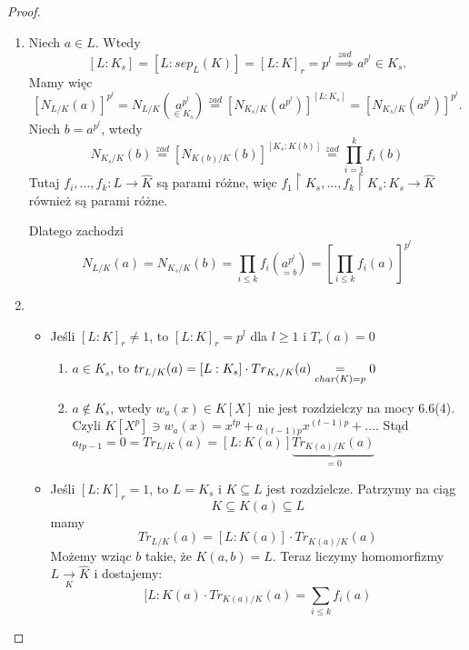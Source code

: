 \begin{proof}$ $\newline
\begin{enumerate}[leftmargin=*]
  \item Niech $a\in L$. Wtedy
    $$[L:K_s]=[L:sep_L(K)]=[L:K]_r=p^l\overset{zad}{\implies} a^{p^l}\in K_s.$$
    Mamy więc
    $$[N_{L/K}(a)]^{p^l}=N_{L/K}(\underset{{\scriptstyle\in K_s}}{a^{p^l}})\overset{zad}{=}[N_{K_s/K}(a^{p^l})]^{[L:K_s]}=[N_{K_s/K}(a^{p^l})]^{p^l}.$$
    Niech $b=a^{p^l}$, wtedy
    $$N_{K_s/K}(b)\overset{zad}{=}[N_{K(b)/K}(b)]^{[K_s:K(b)]}\overset{zad}{=}\prod_{i=1}^kf_i(b)$$
    Tutaj $f_i,...,f_k:L\to \hat{K}$ są parami różne, więc $f_1\restriction K_s,...,f_k\restriction K_s:K_s\to \hat{K}$ również są parami różne.

    Dlatego zachodzi
    $$N_{L/K}(a)=N_{K_s/K}(b)=\prod_{i\leq k}f_i(\underset{{\scriptstyle=b}}{a^{p^l}})=\left[\prod_{i\leq k}f_i(a)\right]^{p^l}$$

    \item 
      \begin{itemize}
        \item Jeśli $[L:K]_r\neq 1$, to $[L:K]_r=p^l$ dla $l\geq 1$ i $T_r(a)=0$
          \begin{enumerate}
             \item $a\in K_s$, to $tr_{L/K}(a)=[L:K_s]\cdot Tr_{K_s/K}(a)\underset{{\scriptsize  char(K)=p}}{=}0$
              \item $a\notin K_s$, wtedy $w_a(x)\in K[X]$ nie jest rozdzielczy na mocy 6.6(4). Czyli $K[X^p]\ni w_a(x)=x^{tp}+a_{(t-1)p}x^{(t-1)p}+...$. Stąd $a_{tp-1}=0=Tr_{L/K}(a)=[L:K(a)]\underbrace{Tr_{K(a)/K}(a)}_{=0}$
          \end{enumerate}
        \item Jeśli $[L:K]_r=1$, to $L=K_s$ i $K\subseteq L$ jest rozdzielcze. Patrzymy na ciąg
    $$K\subseteq K(a)\subseteq L$$
    mamy
    $$Tr_{L/K}(a)=[L:K(a)]\cdot Tr_{K(a)/K}(a)$$
    Możemy wziąc $b$ takie, że $K(a,b)=L$. Teraz liczymy homomorfizmy $L\underset{K}{\to} \hat{K}$ i dostajemy:
    $$[L:K(a)\cdot Tr_{K(a)/K}(a)=\sum_{i\leq k}f_i(a)$$
      \end{itemize}
\end{enumerate}
\end{proof}

